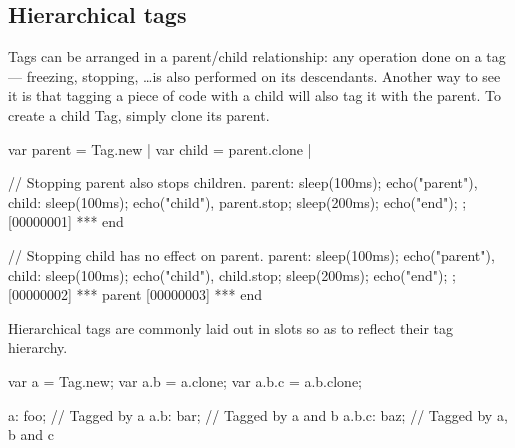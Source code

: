 \subsection{Hierarchical tags}

Tags can be arranged in a parent/child relationship: any operation done on a
tag --- freezing, stopping, \ldots is also performed on its descendants.
Another way to see it is that tagging a piece of code with a child will also
tag it with the parent. To create a child Tag, simply clone its parent.

\begin{urbiscript}
var parent = Tag.new |
var child = parent.clone |

// Stopping parent also stops children.
{
  parent: {sleep(100ms); echo("parent")},
  child:  {sleep(100ms); echo("child")},
  parent.stop;
  sleep(200ms);
  echo("end");
};
[00000001] *** end

// Stopping child has no effect on parent.
{
  parent: {sleep(100ms); echo("parent")},
  child:  {sleep(100ms); echo("child")},
  child.stop;
  sleep(200ms);
  echo("end");
};
[00000002] *** parent
[00000003] *** end
\end{urbiscript}

Hierarchical tags are commonly laid out in slots so as to reflect their tag
hierarchy.

\begin{urbiunchecked}
var a = Tag.new;
var a.b = a.clone;
var a.b.c = a.b.clone;

a:     foo; // Tagged by a
a.b:   bar; // Tagged by a and b
a.b.c: baz; // Tagged by a, b and c
\end{urbiunchecked}


